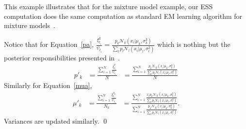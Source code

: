 \begin{Ex}
This example illustrates that for the mixture model example, our ESS computation does the same computation as standard EM learning algorithm for mixture models~\cite{bishop}. 

Notice that for Equation~\ref{pa}, $\frac{\xi^{k}_{t_i}} {\psi_{t_i}} = \frac {p_{k}\mathcal{N}_{k}(x_{i}|\mu_{k},\sigma^{2}_{k}) } {\sum_{l} p_{l}\mathcal{N}_{l}(x_{i}|\mu_{l},\sigma^{2}_{l})}$ which is nothing but the posterior responsibilities presented in~\cite{bishop}. 
\begin{align*}
p'_{k} &= \frac{\sum_{i=1}^{N} \frac{\xi^{k}_{t_i}} {\psi_{t_i}}} {N}
&= \frac {\sum_{i=1}^{N} \frac{p_{k} \mathcal{N}_{X}(x_{i}|\mu_{k}, \sigma^{2}_{k})} {\sum_{l} p_{l}\mathcal{N}_{l}(x_{i}|\mu_{l},\sigma^{2}_{l})} } {N}
\end{align*}
Similarly for Equation~\ref{mua}, 
\begin{align*}
\mu'_{k} &= \frac {\sum_{i=1}^{N} \frac{\xi^{\mu_{k}}_{t_i}} {\psi_{t_i}}} {N_{k}}
&= \frac {\sum_{i=1}^{N} \frac{ x_{i} p_{k} \mathcal{N}_{X}(x_{i}|\mu_{k}, \sigma^{2}_{k})} {\sum_{l} p_{l}\mathcal{N}_{l}(x_{i}|\mu_{l},\sigma^{2}_{l})}}
{\sum_{i=1}^{N}  \frac{p_{k} \mathcal{N}_{X}(x_{i}|\mu_{k}, \sigma^{2}_{k})} {\sum_{l} p_{l}\mathcal{N}_{l}(x_{i}|\mu_{l},\sigma^{2}_{l})}}.
\end{align*}
Variances are updated similarly. 
\qed
\end{Ex}


